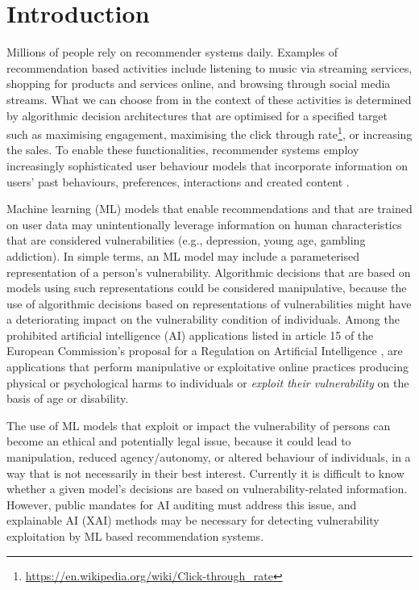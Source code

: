 \documentclass[11pt,theapa]{article}
\theoremstyle{plain}
\newcommand{\clemens}[1]{{\color{asparagus}Clemens: #1}}
\begin{document}
\section{Introduction}
 Millions of people rely on recommender systems daily. Examples of recommendation based activities include listening to music via streaming services, shopping for products and services online, and browsing through social media streams. What we can choose from in the context of these activities is determined by algorithmic decision architectures that are optimised for a specified target such as maximising engagement, maximising the click through rate\footnote{\url{https://en.wikipedia.org/wiki/Click-through_rate}}, or increasing the sales. To enable these functionalities, recommender systems employ increasingly sophisticated user behaviour models that incorporate information on users' past behaviours, preferences, interactions and created content \cite{SlavkovikSPA21}. 

Machine learning (ML) models that enable recommendations and that are trained on user data may unintentionally leverage information on human characteristics that are considered vulnerabilities (e.g., depression, young age, gambling addiction). In simple terms, an ML model may include a parameterised representation of a person's vulnerability. Algorithmic decisions that are based on models using such representations could be considered manipulative, because the use of algorithmic decisions based on representations of vulnerabilities might have a deteriorating impact on the vulnerability condition of individuals. Among the prohibited artificial intelligence (AI) applications listed in article 15 of the European Commission's proposal for a Regulation on Artificial Intelligence \cite{EU-ai-act}, are applications that perform manipulative or exploitative online practices producing physical or psychological harms to individuals or \emph{exploit their vulnerability} on the basis of age or disability.
 
 The use of ML models that exploit or impact the vulnerability of persons can become an ethical and potentially legal issue, because it could lead to manipulation, reduced agency/autonomy, or altered behaviour of individuals, in a way that is not necessarily in their best interest. Currently it is difficult to know whether a given model's decisions are based on vulnerability-related information. However, public mandates for AI auditing must address this issue, and explainable AI (XAI) methods may be necessary for detecting vulnerability exploitation by ML based recommendation systems.
\end{document}
